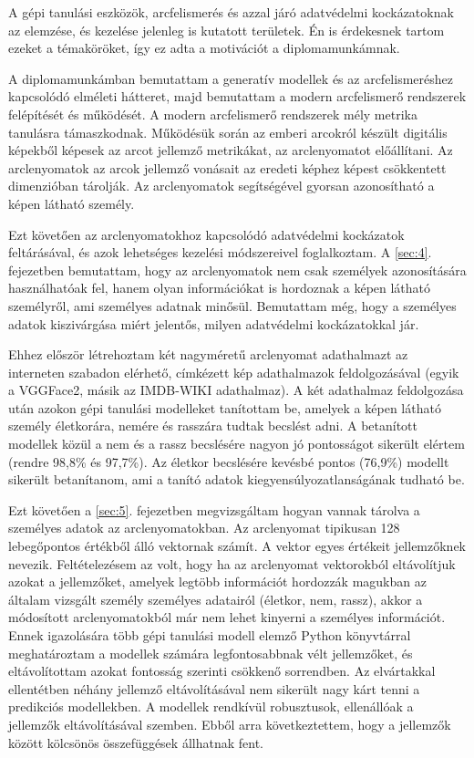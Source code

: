 A gépi tanulási eszközök, arcfelismerés és azzal járó adatvédelmi kockázatoknak az elemzése, és kezelése jelenleg is kutatott területek. Én is érdekesnek tartom ezeket a témaköröket, így ez adta a motivációt a diplomamunkámnak. 

A diplomamunkámban bemutattam a generatív modellek és az arcfelismeréshez kapcsolódó elméleti hátteret, majd bemutattam a modern arcfelismerő rendszerek felépítését és működését. A modern arcfelismerő rendszerek mély metrika tanulásra támaszkodnak. Működésük során az emberi arcokról készült digitális képekből képesek az arcot jellemző metrikákat, az arclenyomatot előállítani. Az arclenyomatok az arcok jellemző vonásait az eredeti képhez képest csökkentett dimenzióban tárolják. Az arclenyomatok segítségével gyorsan azonosítható a képen látható személy.

Ezt követően az arclenyomatokhoz kapcsolódó adatvédelmi kockázatok feltárásával, és azok lehetséges kezelési módszereivel foglalkoztam. A \ref{sec:4}. fejezetben bemutattam, hogy az arclenyomatok nem csak személyek azonosítására használhatóak fel, hanem olyan információkat is hordoznak a képen látható személyről, ami személyes adatnak minősül. Bemutattam még, hogy a személyes adatok kiszivárgása miért jelentős, milyen adatvédelmi kockázatokkal jár.

Ehhez először létrehoztam két nagyméretű arclenyomat adathalmazt az interneten szabadon elérhető, címkézett kép adathalmazok feldolgozásával (egyik a VGGFace2, másik az IMDB-WIKI adathalmaz). A két adathalmaz feldolgozása után azokon gépi tanulási modelleket tanítottam be, amelyek a képen látható személy életkorára, nemére és rasszára tudtak becslést adni. A betanított modellek közül a nem és a rassz becslésére nagyon jó pontosságot sikerült elértem (rendre 98,8\% és 97,7\%). Az életkor becslésére kevésbé pontos (76,9\%) modellt sikerült betanítanom, ami a tanító adatok kiegyensúlyozatlanságának tudható be.

Ezt követően a \ref{sec:5}. fejezetben megvizsgáltam hogyan vannak tárolva a személyes adatok az arclenyomatokban. Az arclenyomat tipikusan 128 lebegőpontos értékből álló vektornak számít. A vektor egyes értékeit jellemzőknek nevezik. Feltételezésem az volt, hogy ha az arclenyomat vektorokból eltávolítjuk azokat a jellemzőket, amelyek legtöbb információt hordozzák magukban az általam vizsgált személy személyes adatairól (életkor, nem, rassz), akkor a módosított arclenyomatokból már nem lehet kinyerni a személyes információt. Ennek igazolására több gépi tanulási modell elemző Python könyvtárral meghatároztam a modellek számára legfontosabbnak vélt jellemzőket, és eltávolítottam azokat fontosság szerinti csökkenő sorrendben. Az elvártakkal ellentétben néhány jellemző eltávolításával nem sikerült nagy kárt tenni a predikciós modellekben. A modellek rendkívül robusztusok, ellenállóak a jellemzők eltávolításával szemben. Ebből arra következtettem, hogy a jellemzők között kölcsönös összefüggések állhatnak fent.

